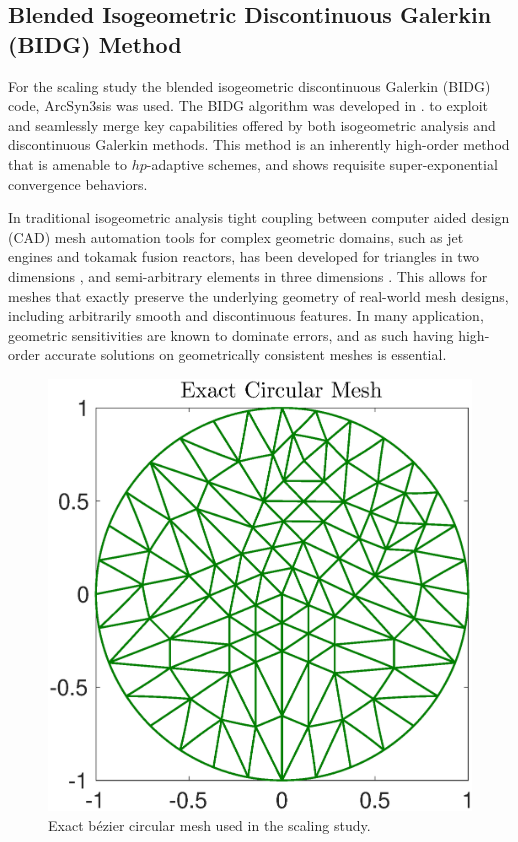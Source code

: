 \subsection{Blended Isogeometric Discontinuous Galerkin (BIDG) Method}
\label{sec:isogeometric}

For the scaling study the blended isogeometric discontinuous Galerkin (BIDG) code, ArcSyn3sis was used.  The BIDG algorithm was developed in \cite{Michoski2016658}. to exploit and seamlessly merge key capabilities offered by both isogeometric analysis and discontinuous Galerkin methods. This method is an inherently high-order method that is amenable to $hp$-adaptive schemes, and shows requisite super-exponential convergence behaviors.

In traditional isogeometric analysis tight coupling between computer aided design (CAD) mesh automation tools for complex geometric domains, such as jet engines and tokamak fusion reactors, has been developed for triangles in two dimensions  \cite{Engvall2016378}, and semi-arbitrary elements in three dimensions \cite{EngvallPress}.  This allows for meshes that exactly preserve the underlying geometry of real-world mesh designs, including arbitrarily smooth and discontinuous features.  In many application, geometric sensitivities are known to dominate errors, and as such having high-order accurate solutions on geometrically consistent meshes is essential.


\begin{figure}[h]
\begin{center}
\includegraphics[width=0.8\linewidth]{./bidg_data/168_circ}
\end{center}
\vspace*{-.5cm}
\caption{Exact b\'{e}zier circular mesh used in the scaling study.}
\label{fig:dns_scaling}
\end{figure}


